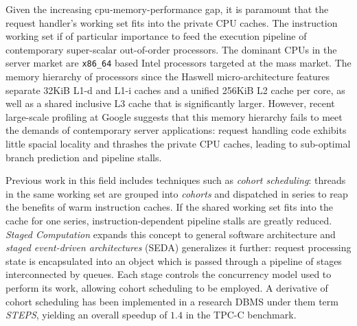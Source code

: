 \documentclass[12pt,a4paper]{book}
\begin{document}
Given the increasing cpu-memory-performance gap, it is paramount that the request handler's working set fits into the private CPU caches.
The instruction working set if of particular importance to feed the execution pipeline of contemporary super-scalar out-of-order processors.
The dominant CPUs in the server market are \texttt{x86\_64} based Intel processors targeted at the mass market.
The memory hierarchy of processors since the Haswell micro-architecture features separate 32KiB L1-d and L1-i caches and a unified 256KiB L2 cache per core, as well as a shared inclusive L3 cache that is significantly larger.
However, recent large-scale profiling at Google suggests that this memory hierarchy fails to meet the demands of contemporary server applications:
request handling code exhibits little spacial locality and thrashes the private CPU caches, leading to sub-optimal branch prediction and pipeline stalls.\cite{kanev2015profiling}

Previous work in this field includes techniques such as \emph{cohort scheduling}:
threads in the same working set are grouped into \emph{cohorts} and dispatched in series to reap the benefits of warm instruction caches.
If the shared working set fits into the cache for one series, instruction-dependent pipeline stalls are greatly reduced.
\emph{Staged Computation} expands this concept to general software architecture and \emph{staged event-driven architectures} (SEDA) generalizes it further:
request processing state is encapsulated into an object which is passed through a pipeline of stages interconnected by queues.
Each stage controls the concurrency model used to perform its work, allowing cohort scheduling to be employed.
A derivative of cohort scheduling has been implemented in a research DBMS under them term \emph{STEPS}, yielding an overall speedup of $1.4$ in the TPC-C benchmark.\cite{cohort,seda,steps,harizopoulos2005staged}
\end{document}
